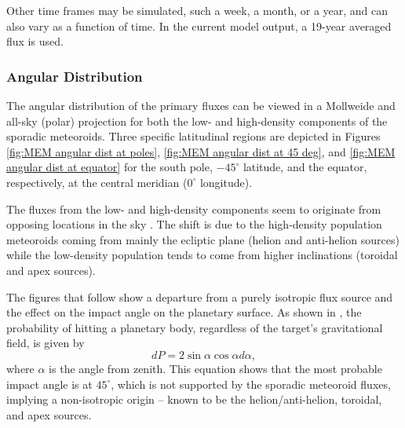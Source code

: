 \documentclass{article}
\begin{document}
Other time frames may be simulated, such a week, a month, or a year, and can also vary as a function of time. In the current model output, a 19-year averaged flux is used.


\subsubsection{Angular Distribution}

The angular distribution of the primary fluxes can be viewed in a Mollweide and all-sky (polar) projection for both the low- and high-density components of the sporadic meteoroids. Three specific latitudinal regions are depicted in Figures \ref{fig:MEM angular dist at poles}, \ref{fig:MEM angular dist at 45 deg}, and \ref{fig:MEM angular dist at equator} for the south pole, $-45^\circ$ latitude, and the equator, respectively, at the central meridian ($0^\circ$ longitude).

The fluxes from the low- and high-density components seem to originate from opposing locations in the sky \citep[e.g., see Figure 2.2 of][]{moorhead2019nasa}. The shift is due to the high-density population meteoroids coming from mainly the ecliptic plane (helion and anti-helion sources) while the low-density population tends to come from higher inclinations (toroidal and apex sources).

The figures that follow show a departure from a purely isotropic flux source and the effect on the impact angle on the planetary surface. As shown in \cite{pierazzo2000understanding}, the probability of hitting a planetary body, regardless of the target's gravitational field, is given by
\begin{equation}
dP = 2\sin\alpha\cos\alpha d\alpha,
\end{equation}
where $\alpha$ is the angle from zenith. This equation shows that the most probable impact angle is at $45^\circ$, which is not supported by the sporadic meteoroid fluxes, implying a non-isotropic origin -- known to be the helion/anti-helion, toroidal, and apex sources.
\end{document}
